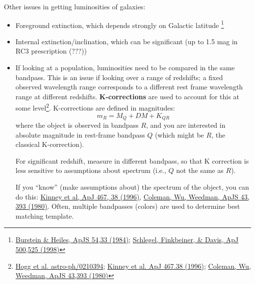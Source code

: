 \documentclass{article}
\newcommand{\mynotes}[1]{\textcolor{cadmiumgreen}{#1}}
\begin{document}
Other issues in getting luminosities of galaxies:
\begin{itemize}
    \item Foreground extinction, which depends strongly on Galactic latitude
        \footnote{\href{http://adsabs.harvard.edu/cgi-bin/nph-bib_query?bibcode=1984ApJS...54...33B}
            {Burstein \& Heiles, ApJS 54,33 (1984)};
            \href{http://adsabs.harvard.edu/cgi-bin/nph-bib_query?bibcode=1998ApJ...500..525S}
            {Schlegel, Finkbeiner, \& Davis, ApJ 500,525 (1998)}}
    \item Internal extinction/inclination, which can be significant
        (up to 1.5 mag in RC3 prescription \mynotes{(???)})
    \item If looking at a population, luminosities need to be compared in
        the same bandpass. This is an issue if looking over a range of
        redshifts; a fixed observed wavelength range corresponds to a
        different rest frame wavelength range at different redshifts.
        \textbf{K-corrections} are used to account for this at some
        level\footnote{\href{http://arxiv.org/abs/astro-ph/0210394}
            {Hogg et al. astro-ph/0210394};
            \href{http://adsabs.harvard.edu/cgi-bin/nph-bib_query?bibcode=1996ApJ...467...38K}
            {Kinney et al. ApJ 467.38 (1996)};
            \href{http://adsabs.harvard.edu/cgi-bin/nph-bib_query?bibcode=1980ApJS...43..393C}
            {Coleman, Wu, Weedman, ApJS 43,393 (1980)}}.
        K-corrections are defined in magnitudes:
        \[
            m_{R} = M_{Q} + DM + K_{QR}
            \]
        where the object is observed in bandpass $R$, and you are interested in
        absolute magnitude in rest-frame bandpass $Q$ (which might be $R$,
        the classical K-correction).

        For significant redshift, measure in different bandpass, so that K
        correction is less sensitive to assumptions about spectrum
        (i.e., $Q$ not the same as $R$).

        If you ``know'' (make assumptions about) the spectrum of the object, you
        can do this:
        \href{http://adsabs.harvard.edu/cgi-bin/nph-bib_query?bibcode=1996ApJ...467...38K}
        {Kinney et al, ApJ 467, 38 (1996)},
        \href{http://adsabs.harvard.edu/cgi-bin/nph-bib_query?bibcode=1980ApJS...43..393C}
        {Coleman, Wu, Weedman, ApJS 43, 393 (1980)}.
        Often, multiple bandpasses (colors) are used to determine best matching
        template.
\end{itemize}
\end{document}
